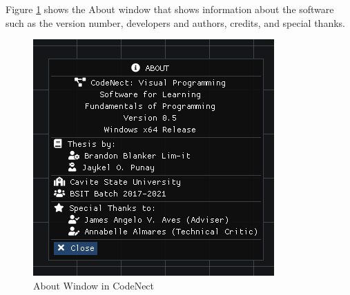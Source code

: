 \parx
Figure \ref{fig:cn_about} shows the About window that shows information about the
software such as the version number, developers and authors, credits, and special thanks.

\begin{figure}[H]
	\centering
	\captionsetup{justification=centering}
	\captionsetup[figure]{list=yes}
	\includegraphics[width=\linewidth]{media/sc_about.png}
	\caption[About Window in CodeNect]{About Window in CodeNect}
	\label{fig:cn_about}
\end{figure}
